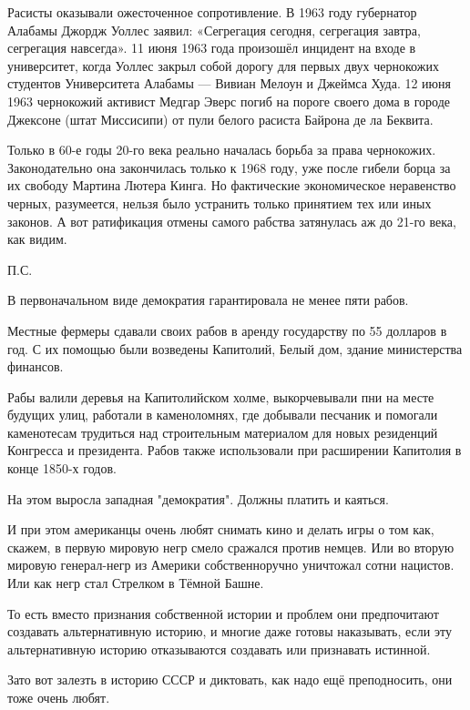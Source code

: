 \documentclass[a4paper,11pt]{extreport}
\begin{document}
Расисты оказывали ожесточенное сопротивление. В 1963 году губернатор Алабамы
Джордж Уоллес заявил: «Сегрегация сегодня, сегрегация завтра, сегрегация
навсегда». 11 июня 1963 года произошёл инцидент на входе в университет, когда
Уоллес закрыл собой дорогу для первых двух чернокожих студентов Университета
Алабамы --- Вивиан Мелоун и Джеймса Худа. 12 июня 1963 чернокожий активист Медгар
Эверс погиб на пороге своего дома в городе Джексоне (штат Миссисипи) от пули
белого расиста Байрона де ла Беквита.

Только в 60-е годы 20-го века реально началась борьба за права чернокожих.
Законодательно она закончилась только к 1968 году, уже после гибели борца за их
свободу Мартина Лютера Кинга. Но фактические экономическое неравенство черных,
разумеется, нельзя было устранить только принятием тех или иных законов. А вот
ратификация отмены самого рабства затянулась аж до 21-го века, как видим.

П.С.

В первоначальном виде демократия гарантировала не менее пяти рабов.

Местные фермеры сдавали своих рабов в аренду государству по 55 долларов в год.
С их помощью были возведены Капитолий, Белый дом, здание министерства финансов.

Рабы валили деревья на Капитолийском холме, выкорчевывали пни на месте будущих
улиц, работали в каменоломнях, где добывали песчаник и помогали каменотесам
трудиться над строительным материалом для новых резиденций Конгресса и
президента. Рабов также использовали при расширении Капитолия в конце 1850-х
годов.

На этом выросла западная "демократия". Должны платить и каяться.

И при этом американцы очень любят снимать кино и делать игры о том как, скажем,
в первую мировую негр смело сражался против немцев. Или во вторую мировую
генерал-негр из Америки собственноручно уничтожал сотни нацистов. Или как негр
стал Стрелком в Тёмной Башне.

То есть вместо признания собственной истории и проблем они предпочитают
создавать альтернативную историю, и многие даже готовы наказывать, если эту
альтернативную историю отказываются создавать или признавать истинной.

Зато вот залезть в историю СССР и диктовать, как надо ещё преподносить, они
тоже очень любят.
  


 
\end{document}
